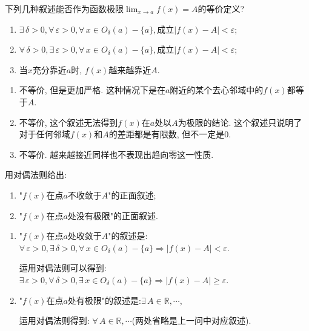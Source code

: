      \begin{exercise}
         下列几种叙述能否作为函数极限$\lim_{x\to a}f(x)=A$的等价定义?
         \begin{enumerate}
             \item $\exists\, \delta>0, \forall\, \varepsilon>0, \forall\, x \in O_\delta(a)-\{a\}, \text{成立}|f(x)-A|<\varepsilon$;
             \item $\forall\, \delta>0, \exists\, \varepsilon>0, \forall\, x \in O_\delta(a)-\{a\}, \text{成立}|f(x)-A|<\varepsilon$;
             \item 当$x$充分靠近$a$时, $f(x)$越来越靠近$A$.
         \end{enumerate}
     \end{exercise}
     \begin{solution}
         \begin{enumerate}
             \item 不等价, 但是更加严格. 这种情况下是在$a$附近的某个去心邻域中的$f(x)$都等于$A$.
             \item 不等价, 这个叙述无法得到$f(x)$在$a$处以$A$为极限的结论. 这个叙述只说明了对于任何邻域$f(x)$和$A$的差距都是有限数, 但不一定是0.
             \item 不等价. 越来越接近同样也不表现出趋向零这一性质.
         \end{enumerate}
     \end{solution}

     \begin{exercise}
         用对偶法则给出:
         \begin{enumerate}
             \item "$f(x)$在点$a$不收敛于$A$"的正面叙述;
             \item "$f(x)$在点$a$处没有极限"的正面叙述.
         \end{enumerate}
     \end{exercise}
     \begin{solution}
         \begin{enumerate}
             \item "$f(x)$在点$a$处收敛于$A$"的叙述是:$\forall\, \varepsilon>0, \exists\, \delta>0, \forall\, x\in O_\delta(a)-\{a\}\Rightarrow |f(x)-A|<\varepsilon$.

                   运用对偶法则可以得到: $\exists\, \varepsilon>0, \forall\, \delta>0,\exists\, x\in O_\delta(a)-\{a\}\Rightarrow |f(x)-A|\geqslant \varepsilon$.
             \item "$f(x)$在点$a$处有极限"的叙述是:$\exists\, A\in \mathbb{R}, \cdots$,

                   运用对偶法则得到: $\forall\, A\in \mathbb{R}, \cdots$(两处省略是上一问中对应叙述).
         \end{enumerate}
     \end{solution}

